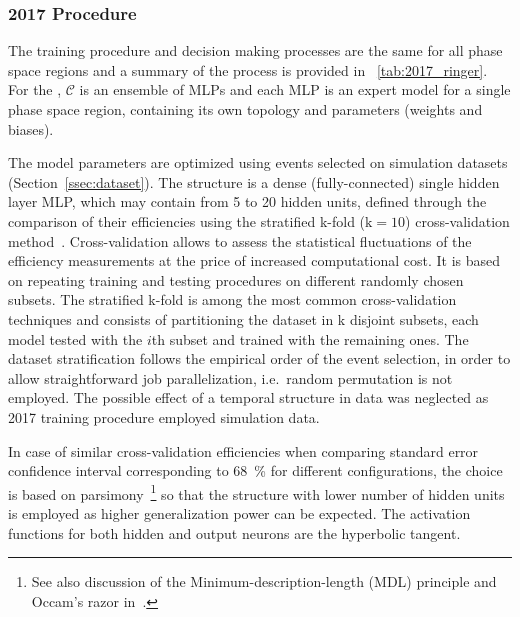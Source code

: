 \subsubsection{2017 Procedure}\label{ssec:2017}

The training procedure and decision making processes are the same for all phase
space regions and a summary of the process is provided in
\tablename~\ref{tab:2017_ringer}. For the \rnn{}, $\mathcal{C}$ is an ensemble of
MLPs and each MLP is an expert model for a single phase space
region, containing its own topology and parameters (weights and biases).

The model parameters are optimized using events selected on simulation datasets
(Section~\ref{ssec:dataset}). The structure is a dense (fully-connected) single
hidden layer MLP, which may contain from 5 to 20 hidden units, defined through
the comparison of their efficiencies using the stratified k-fold ($\text{k}=10$)
cross-validation method~\cite{haykin_2008}. Cross-validation allows to assess the statistical fluctuations of the efficiency measurements 
at the price of increased computational cost. It is
based on repeating training and testing procedures on different
randomly chosen subsets. The stratified k-fold is
among the most common cross-validation techniques and consists of partitioning
the dataset in k disjoint subsets, each model tested with the $i$th subset and
trained with the remaining ones. The dataset stratification follows the
empirical order of the event selection, in order to allow straightforward job
parallelization, i.e.\ random permutation is not employed. The possible effect
of a temporal structure in data was neglected as 2017 training procedure
employed simulation data.

In case of similar cross-validation efficiencies when comparing standard
error confidence interval corresponding to \SI{68}{\%} for different
configurations, the choice is based on
parsimony~\cite{medeiros2001statistical}\footnote{See also discussion of the
  Minimum-description-length (MDL) principle and Occam's razor
in~\cite{haykin_2008}.} so that the structure with lower number of hidden units
is employed as higher generalization power can be expected. The activation
functions for both hidden and output neurons are the hyperbolic tangent.






